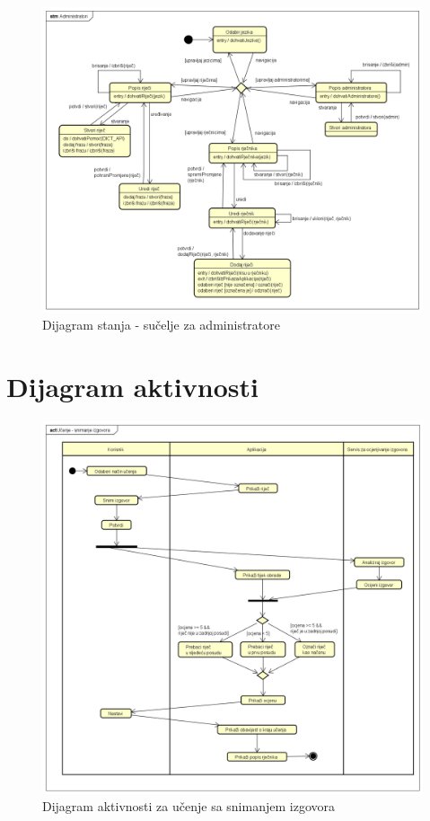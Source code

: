 \begin{figure}[htp]
	\includegraphics[scale=0.4]{dijagrami/state_administratori.png}
	\centering
	\caption{Dijagram stanja - sučelje za administratore}
	\label{fig:state-admin}
\end{figure}
			
			
			\eject 
		
		\section{Dijagram aktivnosti}
			
\begin{figure}[htp]
	\includegraphics[scale=0.4]{dijagrami/aktivnosti.png}
	\centering
	\caption{Dijagram aktivnosti za učenje sa snimanjem izgovora}
	\label{fig:aktivnosti-izgovor}
\end{figure}


